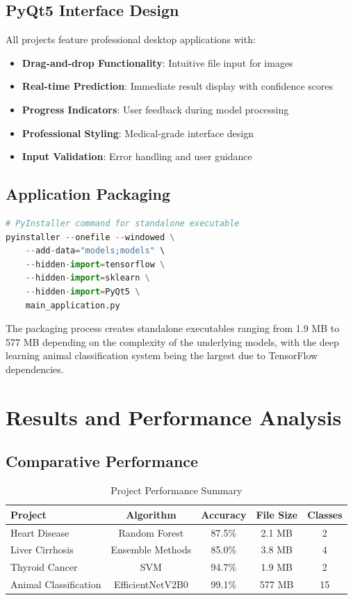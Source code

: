 \documentclass[12pt, a4paper]{article}
\begin{document}
\subsection{PyQt5 Interface Design}
All projects feature professional desktop applications with:
\begin{itemize}
    \item \textbf{Drag-and-drop Functionality}: Intuitive file input for images
    \item \textbf{Real-time Prediction}: Immediate result display with confidence scores
    \item \textbf{Progress Indicators}: User feedback during model processing
    \item \textbf{Professional Styling}: Medical-grade interface design
    \item \textbf{Input Validation}: Error handling and user guidance
\end{itemize}

\subsection{Application Packaging}
\begin{lstlisting}[language=Python, caption=PyInstaller Deployment Configuration]
# PyInstaller command for standalone executable
pyinstaller --onefile --windowed \
    --add-data="models;models" \
    --hidden-import=tensorflow \
    --hidden-import=sklearn \
    --hidden-import=PyQt5 \
    main_application.py
\end{lstlisting}

The packaging process creates standalone executables ranging from 1.9 MB to 577 MB depending on the complexity of the underlying models, with the deep learning animal classification system being the largest due to TensorFlow dependencies.

\section{Results and Performance Analysis}

\subsection{Comparative Performance}
\begin{table}[H]
    \centering
    \begin{tabular}{@{}lcccc@{}}
        \toprule
        Project               & Algorithm        & Accuracy & File Size & Classes \\
        \midrule
        Heart Disease         & Random Forest    & 87.5\%   & 2.1 MB    & 2       \\
        Liver Cirrhosis       & Ensemble Methods & 85.0\%   & 3.8 MB    & 4       \\
        Thyroid Cancer        & SVM              & 94.7\%   & 1.9 MB    & 2       \\
        Animal Classification & EfficientNetV2B0 & 99.1\%   & 577 MB    & 15      \\
        \bottomrule
    \end{tabular}
    \caption{Project Performance Summary}
\end{table}
\end{document}
